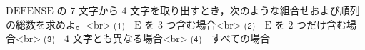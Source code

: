 $\mathrm{DEFENSE}$ の $7$ 文字から $4$ 文字を取り出すとき，次のような組合せおよび順列の総数を求めよ。<br>
⑴　$\mathrm{E}$ を $3$ つ含む場合<br>
⑵　$\mathrm{E}$ を $2$ つだけ含む場合<br>
⑶　$4$ 文字とも異なる場合<br>
⑷　すべての場合
 